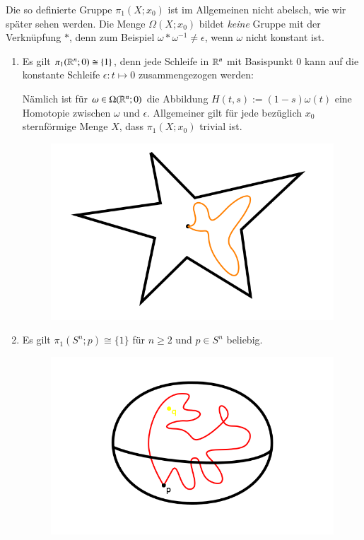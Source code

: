 \documentclass[a4paper,10pt]{scrartcl}
\newcommand{\homo}{\cong}
\begin{document}
Die so definierte Gruppe $\pi_1(X;x_0)$ ist im Allgemeinen nicht abelsch, wie wir später sehen werden. Die Menge $\Omega(X;x_0)$ bildet \emph{keine} Gruppe mit der Verknüpfung $*$, denn zum Beispiel $\omega*\omega^{-1}\neq \epsilon$, wenn $\omega$ nicht konstant ist.
\begin{exs*}
 \begin{enumerate}[(1)]
  \item Es gilt $\pi_1(\R^n;0)\homo \{1\}$, denn jede Schleife in $\mathbb{R}^n$ mit Basispunkt $0$ kann auf die konstante Schleife $\epsilon: t \mapsto 0$ zusammengezogen werden:

Nämlich ist für $\omega \in \Omega(\mathbb{R}^n;0)$ die Abbildung $H(t,s):=(1-s)\omega(t)$ eine Homotopie zwischen $\omega$ und $\epsilon$. Allgemeiner gilt für jede bezüglich $x_0$ sternförmige Menge $X$, dass $\pi_1(X;x_0)$ trivial ist.
\begin{figure}[H]
\centering
\includegraphics[scale=0.3]{fig57.png}
\caption{}
\end{figure}
\item Es gilt $\pi_1(S^n; p) \homo \{1\}$ für $n\ge 2$ und $p\in S^n$ beliebig.
\begin{figure}[H]
\centering
\includegraphics[scale=0.3]{fig58.png}

\end{figure}
\end{enumerate}
\end{exs*}
\end{document}
